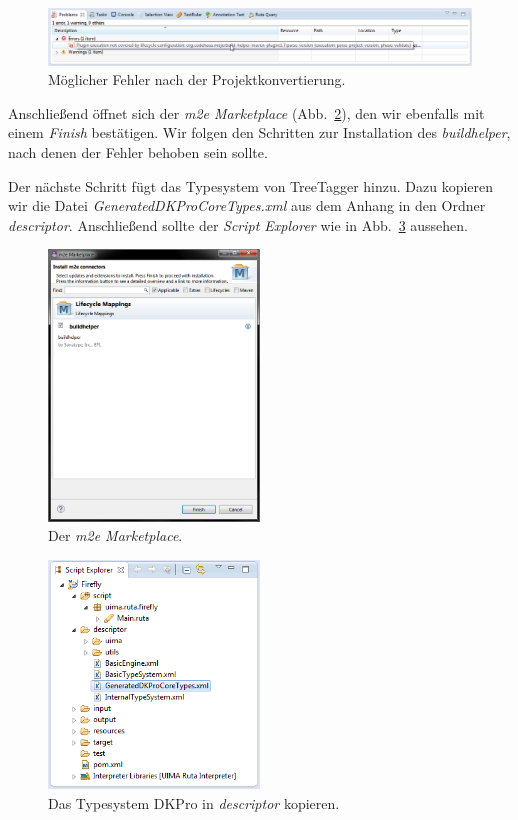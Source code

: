 \documentclass{article}
\begin{document}
\begin{figure}
\centering
\includegraphics[width=1\textwidth]{figs/maven_error.png}
\caption{Möglicher Fehler nach der Projektkonvertierung.}
\label{error}
\end{figure}

Anschließend öffnet sich der \textit{m2e Marketplace} (Abb.~\ref{marketplace}), den wir ebenfalls mit einem \textit{Finish} bestätigen. Wir folgen den Schritten zur Installation des \textit{buildhelper}, nach denen der Fehler behoben sein sollte.

Der nächste Schritt fügt das Typesystem von TreeTagger hinzu. Dazu kopieren wir die  Datei \textit{GeneratedDKProCoreTypes.xml} aus dem Anhang in den Ordner \textit{descriptor}. Anschließend sollte der \textit{Script Explorer} wie in Abb.~\ref{dkpro} aussehen.

\begin{figure}
\centering
\includegraphics[width=0.5\textwidth]{figs/maven_marketplace.png}
\caption{Der \textit{m2e Marketplace}.}
\label{marketplace}
\end{figure}

\begin{figure}
\centering
\includegraphics[width=0.5\textwidth]{figs/tt_dkpro.png}
\caption{Das Typesystem DKPro in \textit{descriptor} kopieren.}
\label{dkpro}
\end{figure}
\end{document}
